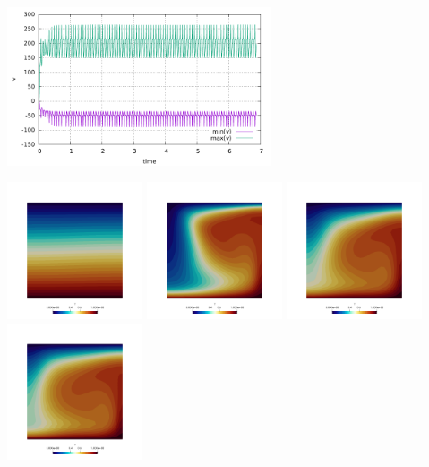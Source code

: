 \begin{center}
\includegraphics[width=7.8cm]{python_codes/fieldstone_28/results_case5/v.pdf}
\end{center}


\newpage
\noindent
\begin{center}
\includegraphics[width=4cm]{python_codes/fieldstone_28/results_case5/T_0000}
\includegraphics[width=4cm]{python_codes/fieldstone_28/results_case5/T_0010}
\includegraphics[width=4cm]{python_codes/fieldstone_28/results_case5/T_0020}
\includegraphics[width=4cm]{python_codes/fieldstone_28/results_case5/T_0030}\\

\end{center}
